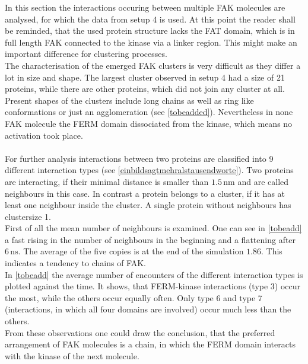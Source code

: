 In this section the interactions occuring between multiple FAK molecules are analysed, for which the data from setup 4 is used. At this point the reader shall be reminded, that the used protein structure lacks the FAT domain, which is in full length FAK connected to the kinase via a linker region. This might make an important difference for clustering processes.\\
The characterisation of the emerged FAK clusters is very difficult as they differ a lot in size and shape. The largest cluster observed in setup 4 had a size of 21 proteins, while there are other proteins, which did not join any cluster at all. Present shapes of the clusters include long chains as well as ring like conformations or just an agglomeration (see \autoref{tobeadded}). Nevertheless in none FAK molecule the FERM domain dissociated from the kinase, which means no activation took place.\\
\\
For further analysis interactions between two proteins are classified into 9 different interaction types (see \autoref{einbildsagtmehralstausendworte}). Two proteins are interacting, if their minimal distance is smaller than $1.5\,\si{\nano\metre}$ and are called neighbours in this case. In contrast a protein belongs to a cluster, if it has at least one neighbour inside the cluster. A single protein without neighbours has clustersize 1.\\
First of all the mean number of neighbours is examined. One can see in \autoref{tobeadd} a fast rising in the number of neighbours in the beginning and a flattening after $6\,\si{\nano\second}$. The average of the five copies is at the end of the simulation $1.86$. This indicates a tendency to chains of FAK.\\
In \autoref{tobeadd} the average number of encounters of the different interaction types is plotted against the time. It shows, that FERM-kinase interactions (type 3) occur the most, while the others occur equally often. Only type 6 and type 7 (interactions, in which all four domains are involved) occur much less than the others.\\
From these observations one could draw the conclusion, that the preferred arrangement of FAK molecules is a chain, in which the FERM domain interacts with the kinase of the next molecule.


